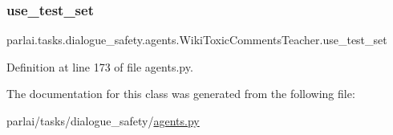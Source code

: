 \subsubsection{\texorpdfstring{use\+\_\+test\+\_\+set}{use\_test\_set}}
{\footnotesize\ttfamily parlai.\+tasks.\+dialogue\+\_\+safety.\+agents.\+Wiki\+Toxic\+Comments\+Teacher.\+use\+\_\+test\+\_\+set}



Definition at line 173 of file agents.\+py.



The documentation for this class was generated from the following file\+:\begin{DoxyCompactItemize}
\item 
parlai/tasks/dialogue\+\_\+safety/\hyperlink{parlai_2tasks_2dialogue__safety_2agents_8py}{agents.\+py}\end{DoxyCompactItemize}
